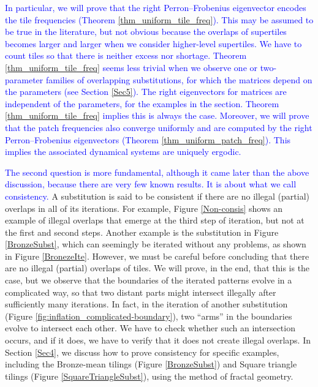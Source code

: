 \documentclass[a4]{amsart}
\theoremstyle{definition}
\begin{document}
\textcolor{blue}{In particular, we will prove that the right Perron--Frobenius eigenvector encodes the tile frequencies (Theorem \ref{thm_uniform_tile_freq}). This may be assumed to be true in the literature, but not obvious because the overlaps of supertiles becomes larger and larger when we consider higher-level supertiles. We have to count tiles so that there is neither excess nor shortage. Theorem \ref{thm_uniform_tile_freq} seems less trivial when we observe one or two-parameter families of overlapping substitutions, for which the matrices depend on the parameters (see Section \ref{Sec5}).  The right eigenvectors for matrices are independent of the parameters, for the examples in the section. Theorem \ref{thm_uniform_tile_freq} implies this is always the case.
Moreover, we will prove that the patch frequencies also converge uniformly and are computed by the right Perron--Frobenius eigenvectors (Theorem \ref{thm_uniform_patch_freq}). This implies the associated dynamical systems are uniquely ergodic.}

\textcolor{blue}{
The second question is more fundamental, although it came later than the above discussion, because there are very few known results. It is
about what we call consistency.} 
{\color{blue}A substitution is said to be consistent if there are no illegal (partial) overlaps in all of its iterations.
For example, Figure \ref{Non-consis}
shows an example of illegal overlaps that emerge at the third step of iteration, but not at the first and second steps. Another example is the substitution in Figure \ref{BronzeSubst}, which can seemingly be iterated without any problems, as shown in Figure \ref{BronezeIte}. However, we must be careful before concluding that there are no illegal (partial) overlaps of tiles. We will prove, in the end, that this is the case, but we observe that the boundaries of the iterated patterns evolve in a complicated way, so that two distant parts might intersect illegally after sufficiently many iterations. In fact, in the iteration of another substitution (Figure \ref{fig:inflation_complicated-boundary}), two ``arms'' in the boundaries evolve to intersect each other.
We have to check whether such an intersection occurs, and if it does, we have to verify that it does not create illegal overlaps. In Section \ref{Sec4}, we discuss how to prove consistency for specific examples, including the Bronze-mean tilings (Figure \ref{BronzeSubst}) and Square triangle tilings (Figure \ref{SquareTriangleSubst}), using the method of fractal geometry.}
\end{document}
